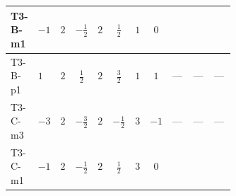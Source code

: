 \documentclass[8pt]{article}
\begin{document}
\begin{landscape}
\begin{longtable}{@{}llcccccc >{\raggedright\arraybackslash}p{0.21\linewidth} >{\raggedright\arraybackslash}p{0.21\linewidth} >{\raggedright\arraybackslash}p{0.21\linewidth}@{}}
T3-B-m1 & $-1$ & $2$ & $-\frac{1}{2}$ & $2$ & $\frac{1}{2}$ & $1$ & $0$ & \scriptsize\adjustbox{max width=\linewidth}{$\begin{gathered} {\lambda_{HS_1}^{(1)}} \left(\frac{1}{2} \operatorname{Tr}\!\left({y_2}\,\left({y_1}\right)^{\dagger}\right)+4 {\lambda_{H H^\dagger S_1^\dagger S_2^\dagger}^{\rm Cross}}+3 {\lambda_{11}}\right)\end{gathered}$} & \scriptsize\adjustbox{max width=\linewidth}{$\begin{gathered} +{\lambda_{HS_1}^{(A)}} \left(-\frac{1}{8} \operatorname{Tr}\!\left({y_2}\,\left({y_1}\right)^{\dagger}\right)-\frac{{\lambda_{H H^\dagger S_1^\dagger S_2^\dagger}^{\rm Cross}}}{2}-\frac{{\lambda_{11}}}{4}\right)\end{gathered}$} & \scriptsize\adjustbox{max width=\linewidth}{$\begin{gathered} +{\lambda_{HS_2}^{(1)}} \left(\frac{1}{2} \operatorname{Tr}\!\left({y_2}\,\left({y_1}\right)^{\dagger}\right)+4 {\lambda_{H H^\dagger S_1^\dagger S_2^\dagger}^{\rm Cross}}+3 {\lambda_{10}}\right)\end{gathered}$} \\
\midrule
T3-B-p1 & $1$ & $2$ & $\frac{1}{2}$ & $2$ & $\frac{3}{2}$ & $1$ & $1$ & --- & --- & --- \\
\midrule
T3-C-m3 & $-3$ & $2$ & $-\frac{3}{2}$ & $2$ & $-\frac{1}{2}$ & $3$ & $-1$ & --- & --- & --- \\
\midrule
T3-C-m1 & $-1$ & $2$ & $-\frac{1}{2}$ & $2$ & $\frac{1}{2}$ & $3$ & $0$ & \scriptsize\adjustbox{max width=\linewidth}{$\begin{gathered} {\lambda_{HS_1}^{(1)}} \left(\frac{3}{4} \operatorname{Tr}\!\left({y_2}\,\left({y_1}\right)^{\dagger}\right)+4 {\lambda_{H H^\dagger S_1^\dagger S_2^\dagger}^{\rm Cross}}+3 {\lambda_{11}}\right)\end{gathered}$} & \scriptsize\adjustbox{max width=\linewidth}{$\begin{gathered} +{\lambda_{HS_1}^{(A)}} \left(-\frac{3}{16} \operatorname{Tr}\!\left({y_2}\,\left({y_1}\right)^{\dagger}\right)-\frac{{\lambda_{H H^\dagger S_1^\dagger S_2^\dagger}^{\rm Cross}}}{2}-\frac{{\lambda_{11}}}{4}\right)\end{gathered}$} & \scriptsize\adjustbox{max width=\linewidth}{$\begin{gathered} +{\lambda_{HS_2}^{(1)}} \left(\frac{3}{4} \operatorname{Tr}\!\left({y_2}\,\left({y_1}\right)^{\dagger}\right)+4 {\lambda_{H H^\dagger S_1^\dagger S_2^\dagger}^{\rm Cross}}+3 {\lambda_{10}}\right)\end{gathered}$} \\

\end{longtable}
\end{landscape}
\end{document}
